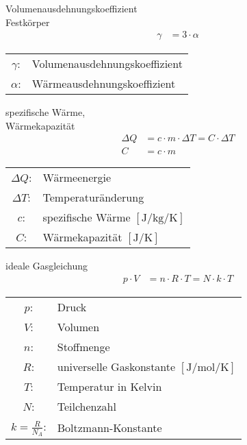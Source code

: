 \begin{karte}{Volumenausdehnungskoeffizient \\ Festkörper}
    \begin{align*}
        \gamma &= 3 \cdot \alpha
    \end{align*}
    \begin{tabular}[t]{cl}
        \( \gamma \): & Volumenausdehnungskoeffizient \\
        \( \alpha \): & Wärmeausdehnungskoeffizient
    \end{tabular}
\end{karte}

\begin{karte}{spezifische Wärme, \\ Wärmekapazität}
    \begin{align*}
        \Delta Q&= c \cdot m \cdot \Delta T = C \cdot \Delta T \\
        C &= c \cdot m
    \end{align*}
    \begin{tabular}[t]{cl}
        \( \Delta Q \): & Wärmeenergie \\
        \( \Delta T \): & Temperaturänderung \\
        \( c \): & spezifische Wärme \( [ \si{\joule\per\kilogram\per\kelvin} ] \) \\
        \( C \): & Wärmekapazität \( [ \si{\joule\per\kelvin} ] \) \\
    \end{tabular}
\end{karte}

\begin{karte}{ideale Gasgleichung}
    \begin{align*}
        p \cdot V &= n \cdot R \cdot T = N \cdot k \cdot T
    \end{align*}
    \begin{tabular}[t]{cl}
        \( p \): & Druck \\
        \( V \): & Volumen \\
        \( n \): & Stoffmenge \\
        \( R \): & universelle Gaskonstante \([ \si{\joule\per\mol\per\kelvin} ] \)\\
        \( T \): & Temperatur in Kelvin\\
        \( N \): & Teilchenzahl \\
        \( k = \tfrac{R}{N_A} \): & Boltzmann-Konstante 
    \end{tabular}
\end{karte}

